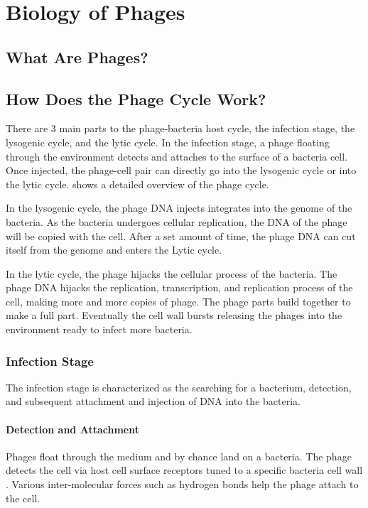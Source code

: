 \section{Biology of Phages}
\subsection{What Are Phages?}

\subsection{How Does the Phage Cycle Work?}
There are 3 main parts to the phage-bacteria host cycle, the infection stage, the lysogenic cycle, and the lytic cycle. 
In the infection stage, a phage floating through the environment detects and attaches to the surface of a bacteria cell. 
Once injected, the phage-cell pair can directly go into the lysogenic cycle or into the lytic cycle. 
 shows a detailed overview of the phage cycle. 
\newline 

In the lysogenic cycle, the phage DNA injects integrates into the genome of the bacteria. 
As the bacteria undergoes cellular replication, the DNA of the phage will be copied with the cell. 
After a set amount of time, the phage DNA can cut itself from the genome and enters the Lytic cycle.
\newline 

In the lytic cycle, the phage hijacks the cellular process of the bacteria. 
The phage DNA hijacks the replication, transcription, and replication process of the cell, making more and more copies of phage. 
The phage parts build together to make a full part. 
Eventually the cell wall bursts releasing the phages into the environment ready to infect more bacteria. 

\subsubsection{Infection Stage}
The infection stage is characterized as the searching for a bacterium, detection, and subsequent attachment and injection of DNA into the bacteria. 
\paragraph{Detection and Attachment}
Phages float through the medium and by chance land on a bacteria. The phage detects the cell via host cell surface receptors tuned to a specific bacteria cell wall \cite{stoneUnderstandingExploitingPhage2019}. 
Various inter-molecular forces such as hydrogen bonds help the phage attach to the cell. 
